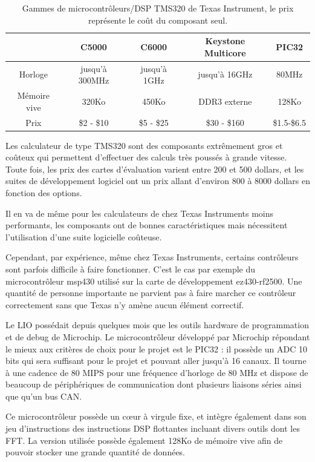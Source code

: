 \documentclass[letterpaper, twoside, 12pt, memoire, creativecommons, hyperref]{thETS}
\begin{document}
\begin{table}[ht]
	\caption{Gammes de microcontrôleurs/DSP TMS320 de Texas Instrument, le prix représente le coût du composant seul. }
		\begin{tabular}{|c|c|c|c|c|}
		\hline
			& C5000 & C6000 & Keystone Multicore & PIC32\\
	    \hline
	    	Horloge & jusqu'à 300MHz & jusqu'à 1GHz & jusqu'à 16GHz & 80MHz\\
	    \hline
			Mémoire vive & 320Ko & 450Ko & DDR3 externe & 128Ko\\
	    \hline
	    	Prix & \$2 - \$10 & \$5 - \$25 & \$30 - \$160 & \$1.5-\$6.5\\
	    \hline
		\end{tabular}
	\label{tab:tms320}
\end{table}

Les calculateur de type TMS320 sont des composants extrêmement gros et coûteux qui permettent d'effectuer des calculs très poussés à grande vitesse.  Toute fois, les prix des cartes d'évaluation varient entre 200 et 500 dollars, et les suites de développement logiciel ont un prix allant d'environ 800 à 8000 dollars en fonction des options. 

Il en va de même pour les calculateurs de chez Texas Instruments moins performants, les composants ont de bonnes caractéristiques mais nécessitent l'utilisation d'une suite logicielle coûteuse. 

Cependant, par expérience, même chez Texas Instruments, certains contrôleurs sont parfois difficile à faire fonctionner. C'est le cas par exemple du microcontrôleur msp430 utilisé sur la carte de développement ez430-rf2500. Une quantité de personne importante ne parvient pas à faire marcher ce contrôleur correctement sans que Texas n'y amène aucun élément correctif.

Le LIO possédait depuis quelques mois que les outils hardware de programmation et de debug de Microchip. Le microcontrôleur développé par Microchip répondant le mieux aux critères de choix pour le projet est le PIC32 : il possède un ADC 10 bits qui sera suffisant pour le projet et pouvant aller jusqu’à 16 canaux. Il tourne à une cadence de 80 MIPS pour une fréquence d'horloge de 80 MHz et dispose de beaucoup de périphériques de communication dont plusieurs liaisons séries ainsi que qu’un bus CAN. 

Ce microcontrôleur possède un cœur à virgule fixe, et intègre également dans son jeu d'instructions des instructions DSP flottantes incluant divers outils dont les FFT. La version utilisée possède également 128Ko de mémoire vive afin de pouvoir stocker une grande quantité de données.
\end{document}
